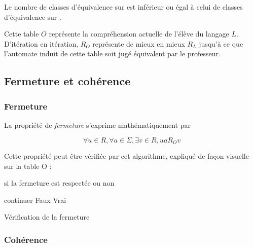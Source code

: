 	\begin{corollary}
		Le nombre de classes d'équivalence sur \ro est inférieur ou égal à celui de classes d'équivalence sur \rl.
	\end{corollary}

	Cette table $O$ représente la compréhension actuelle de l'élève du langage $L$. D'itération en itération, $R_O$ représente de mieux en mieux $R_L$ jusqu'à ce que l'automate induit de cette table soit jugé équivalent par le professeur.





\subsection{Fermeture et cohérence}

\subsubsection*{Fermeture}
La propriété de \emph{fermeture} s'exprime mathématiquement par

$$ \forall u \in R, \forall a \in \Sigma, \exists v \in R, ua R_O v$$

Cette propriété peut être vérifiée par cet algorithme, expliqué de façon visuelle sur la table O :

\begin{algorithm}[H]
	\begin{algorithmic}[1]
		\ENSURE si la fermeture est respectée ou non

				\STATE continuer
			\ELSE
				\STATE {}
					\RETURN Faux
				\ENDIF
			\ENDIF
		\ENDFOR
		\ENDFOR
		\RETURN Vrai
	\end{algorithmic}
	\caption{Vérification de la fermeture}\label{alg:fermeture}
\end{algorithm}

\subsubsection*{Cohérence}

